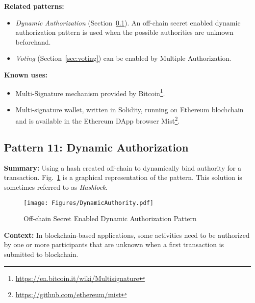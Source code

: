 
\vspace{0.5em}\noindent \textbf{Related patterns:}
\begin{itemize}
    \item \textit{Dynamic Authorization} (Section~\ref{sec:dynamic}). An off-chain secret enabled dynamic authorization pattern is used when the possible authorities are unknown beforehand. 
    \item \textit{Voting} (Section~\ref{sec:voting}) can be enabled by Multiple Authorization.
\end{itemize}


\vspace{0.5em}\noindent \textbf{Known uses:}
\begin{itemize}
  \item Multi-Signature mechanism provided by Bitcoin\footnote{\url{https://en.bitcoin.it/wiki/Multisignature}}.
  \item Multi-signature wallet, written in Solidity, running on Ethereum blochchain and is available in the Ethereum DApp browser Mist\footnote{\label{mist}\url{https://github.com/ethereum/mist}}.
\end{itemize}


\subsection{ \textbf{Pattern 11: Dynamic Authorization}}
\label{sec:dynamic}

\noindent \textbf{Summary:} Using a hash created off-chain to dynamically bind authority for a transaction. Fig.~\ref{fig:dynamic} is a graphical representation of the pattern. This solution is sometimes referred to as \emph{Hashlock}.


\begin{figure}[t]
\begin{center}
\texttt{[image: Figures/DynamicAuthority.pdf]}
\caption{Off-chain Secret Enabled Dynamic Authorization Pattern}\label{fig:dynamic}
\end{center}
\end{figure}

\vspace{0.5em}\noindent \textbf{Context:} 
In blockchain-based applications, some activities need to be authorized by one or more participants that are unknown when a first transaction is submitted to blockchain. 


